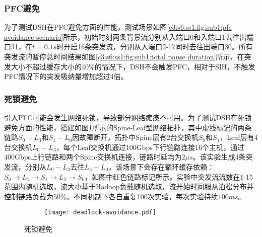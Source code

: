 \subsubsection{PFC避免}

为了测试DSH在PFC避免方面的性能，测试场景如图\ref{c3:s6:ss1:fig:sub1:pfc avoidance scenario}所示，初始时刻两条背景流分别从入端口0和入端口1去往出端口31，在$t=0.1s$时开启16条突发流，分别从入端口2-17同时去往出端口30。所有突发流的暂停总时间结果如图\ref{c3:s6:ss1:fig:sub1:total pause duration}所示，在突发大小不超过缓存大小的40\%的情况下，DSH不会触发PFC，相对于SIH，不触发PFC情况下的突发吸纳量增加超过4倍。

\subsubsection{死锁避免}

引入PFC可能会发生网络死锁\cite{SIGCOMM16RDMA,INFOCOM14TCP-Bolt,CoNEXT17Tagger,SIGCOMM19GFC,INFOCOM22ITSY}，导致部分网络瘫痪不可用。为了测试DSH在死锁避免方面的性能，搭建如图\ref{c3:s6:ss1:fig:sub1:deadlock scenario}所示的Spine-Leaf型网络拓扑，其中虚线标记的两条链路$S_0-L_3$和$S_1-L_0$因故障断开，拓扑中Spine层有2台交换机$S_0$和$S_1$，Leaf层有4台交换机$L_0-L_3$，每个Leaf交换机通过100Gbps下行链路连接16个主机，通过400Gbps上行链路和两个Spine交换机连接，链路时延均为$2\mu s$。该实验生成4条突发流，分别从$L_0-L_3$去往$L_3-L_0$，该场景下会存在循环缓存依赖：$S_0 \rightarrow L_1 \rightarrow S_1 \rightarrow L_2 \rightarrow S_0$，如图中红色链路标记所示。实验中突发流流数在1-15范围内随机选取，流大小基于Hadoop\cite{SIGCOMM10DCTCP}负载随机选取，流开始时间服从泊松分布并控制链路负载为50\%。不同机制下各自重复100次实验，每次实验持续$100ms$。

\begin{figure}[H]
  \begin{subfigure}[b]{0.49\linewidth}
      \centering
      \resizebox{\linewidth}{!}{}
      \label{c3:s6:ss1:fig:sub1:deadlock scenario}
  \end{subfigure}
  \begin{subfigure}[b]{0.49\linewidth}
      \centering
      \texttt{[image: deadlock-avoidance.pdf]}
      \label{c3:s6:ss1:fig:sub1:cdf of deadlock onset time}
  \end{subfigure}
  \caption{死锁避免}
  \label{c3:s6:ss1:fig:deadlock avoidance}
\end{figure}

